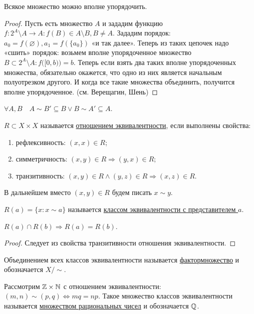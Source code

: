 \begin{theo}[Цермело]
	Всякое множество можно вполне упорядочить.
\end{theo}
\begin{proof}
	Пусть есть множество $A$ и зададим функцию $f: 2^A \setminus A \to A: f(B) \in A \setminus B, B \neq A$. Зададим порядок: $a_0 = f(\varnothing), a_1 = f(\{a_0\})$ «и так далее». Теперь из таких цепочек надо «сшить» порядок: возьмем вполне упорядоченное множество $B \subset 2^A \setminus A: f\big( [0,b) \big) = b$. Теперь если взять два таких вполне упорядоченных множества, обязательно окажется, что одно из них является начальным полуотрезком другого. И когда все такие множества объединить, получится вполне упорядоченное. (см. Верещагин, Шень)
\end{proof}
\begin{cor}
	$\forall A,B \quad A \sim B' \subseteq B \lor B \sim A' \subseteq A$.\\
\end{cor}

\begin{defin}
	$R \subset X \times X$ называется \underline{отношением эквивалентности}, если выполнены свойства:
	\begin{enumerate}
		\item рефлексивность: $(x,x) \in R$;
		\item симметричность: $(x,y) \in R \Rightarrow (y,x) \in R$;
		\item транзитивность: $(x,y) \in R \land (y,z) \in R \Rightarrow (x,z) \in R$.
	\end{enumerate}
\end{defin}
В дальнейшем вместо $(x,y) \in R$ будем писать $x \sim y$.

\begin{defin}
	$R(a) = \{x: x \sim a\}$ называется \underline{классом эквивалентности с представителем $a$}.
\end{defin}
\begin{claim}
	$R(a) \cap R(b) \Rightarrow R(a) = R(b)$.
\end{claim}
\begin{proof}
	Следует из свойства транзитивности отношения эквивалентности.
\end{proof}
\begin{defin}
	Объединением всех классов эквивалентности называется \underline{фактормножество} и обозначается $X/\!\sim$.
\end{defin}

\begin{defin}
	Рассмотрим $\mathbb{Z} \times \mathbb{N}$ с отношением эквивалентности: $(m,n) \sim (p,q) \Leftrightarrow mq=np$. Такое множество классов эквивалентности называется \underline{множеством рациональных чисел} и обозначается $\mathbb{Q}$.\\
\end{defin}

